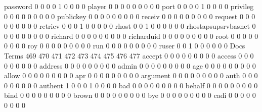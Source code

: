 \documentclass[compress,8pt]{beamer}
\begin{document}
\begin{frame}
\begin{Schunk}
  password                                   0   0   0   0   1   0   0   0   0
  player                                     0   0   0   0   0   0   0   0   0
  port                                       0   0   0   0   1   0   0   0   0
  privileg                                   0   0   0   0   0   0   0   0   0
  publickey                                  0   0   0   0   0   0   0   0   0
  receiv                                     0   0   0   0   0   0   0   0   0
  request                                    0   0   0   0   0   0   0   0   0
  retriev                                    0   0   0   1   0   0   0   0   0
  rhost                                      0   0   1   0   0   0   0   0   0
  rhostapsupsrvbasnet                        0   0   0   0   0   0   0   0   0
  richard                                    0   0   0   0   0   0   0   0   0
  richarduid                                 0   0   0   0   0   0   0   0   0
  root                                       0   0   0   0   0   0   0   0   0
  roy                                        0   0   0   0   0   0   0   0   0
  run                                        0   0   0   0   0   0   0   0   0
  ruser                                      0   0   1   0   0   0   0   0   0
                                          Docs
Terms                                      469 470 471 472 473 474 475 476 477
  accept                                     0   0   0   0   0   0   0   0   0
  access                                     0   0   0   0   0   0   0   0   0
  address                                    0   0   0   0   0   0   0   0   0
  admin                                      0   0   0   0   0   0   0   0   0
  age                                        0   0   0   0   0   0   0   0   0
  allow                                      0   0   0   0   0   0   0   0   0
  apr                                        0   0   0   0   0   0   0   0   0
  argument                                   0   0   0   0   0   0   0   0   0
  auth                                       0   0   0   0   0   0   0   0   0
  authent                                    1   0   0   0   1   0   0   0   0
  bad                                        0   0   0   0   0   0   0   0   0
  behalf                                     0   0   0   0   0   0   0   0   0
  bind                                       0   0   0   0   0   0   0   0   0
  brown                                      0   0   0   0   0   0   0   0   0
  bye                                        0   0   0   0   0   0   0   0   0
  cadi                                       0   0   0   0   0   0   0   0   0

\end{Schunk}
\end{frame}
\end{document}
